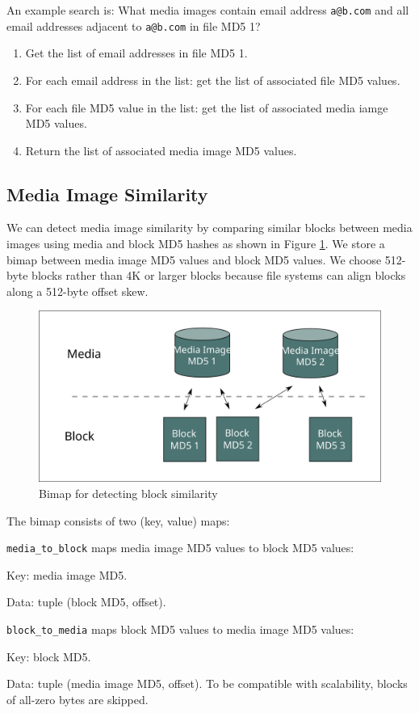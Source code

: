 \documentclass[12pt,twoside]{article}
\begin{document}
An example search is: What media images contain email address \verb+a@b.com+ and all email addresses adjacent to \verb+a@b.com+ in file MD5 1?

\begin{enumerate}
\item Get the list of email addresses in file MD5 1.
\item For each email address in the list: get the list of associated file MD5 values.
\item For each file MD5 value in the list: get the list of associated media iamge MD5 values.
\item Return the list of associated media image MD5 values.
\end{enumerate}

\subsection{Media Image Similarity}
We can detect media image similarity by comparing similar blocks between media images using media and block MD5 hashes as shown in Figure \ref{fig:blockSimilarity}.  We store a bimap between media image MD5 values and block MD5 values. We choose 512-byte blocks rather than 4K or larger blocks because file systems can align blocks along a 512-byte offset skew.

\begin{figure}
	\center
	\includegraphics[scale=.45]{block_similarity}
	\caption{Bimap for detecting block similarity}
	\label{fig:blockSimilarity}
\end{figure}

The bimap consists of two (key, value) maps:
\begin{compactitem}
\item \verb+media_to_block+ maps media image MD5 values to block MD5 values:
  \begin{compactitem}
  \item Key: media image MD5.
  \item Data: tuple (block MD5, offset).
  \end{compactitem}
\item \verb+block_to_media+ maps block MD5 values to media image MD5 values:
  \begin{compactitem}
  \item Key: block MD5.
  \item Data: tuple (media image MD5, offset). To be compatible with scalability, blocks of all-zero bytes are skipped.
  \end{compactitem}
\end{compactitem}
\end{document}
